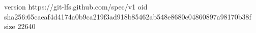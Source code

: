 version https://git-lfs.github.com/spec/v1
oid sha256:65caeaf4d4174a0b9ca219f3ad918b85462ab548e8680c04860897a98170b38f
size 22640
